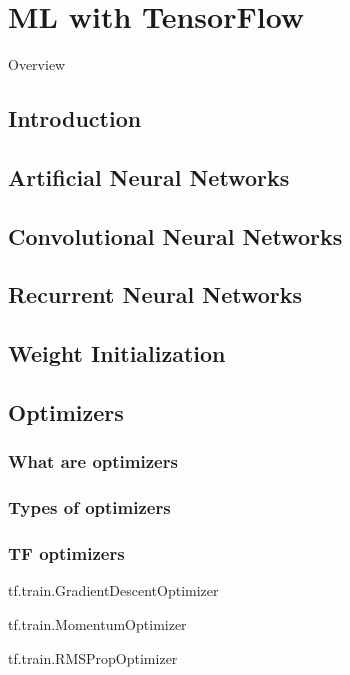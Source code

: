 \chapter{ML with TensorFlow}

Overview

\section{Introduction}

\section{Artificial Neural Networks}

\section{Convolutional Neural Networks}

\section{Recurrent Neural Networks}

\section{Weight Initialization}




\section{Optimizers}

\subsection{What are optimizers}

\subsection{Types of optimizers}

\subsection{TF optimizers}

tf.train.GradientDescentOptimizer

tf.train.MomentumOptimizer

tf.train.RMSPropOptimizer

